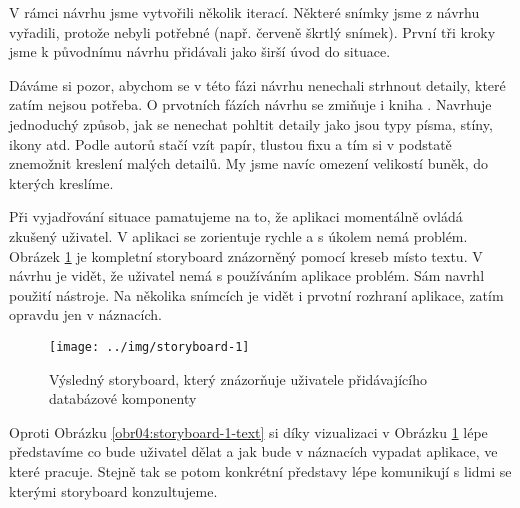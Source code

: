 V rámci návrhu jsme vytvořili několik iterací. Některé snímky jsme z návrhu vyřadili, protože nebyli potřebné (např. červeně škrtlý snímek). První tři kroky jsme k původnímu návrhu přidávali jako širší úvod do situace.

Dáváme si pozor, abychom se v této fázi návrhu nenechali strhnout detaily, které zatím nejsou potřeba. O prvotních fázích návrhu se zmiňuje i kniha \cite{Refactoring_UI}. Navrhuje jednoduchý způsob, jak se nenechat pohltit detaily jako jsou typy písma, stíny, ikony atd. Podle autorů stačí vzít papír, tlustou fixu a tím si v podstatě znemožnit kreslení malých detailů. My jsme navíc omezení velikostí buněk, do kterých kreslíme.

Při vyjadřování situace pamatujeme na to, že aplikaci momentálně ovládá zkušený uživatel. V  aplikaci se zorientuje rychle a s úkolem nemá problém. Obrázek \ref{obr04:storyboard-1} je kompletní storyboard znázorněný pomocí kreseb místo textu. V návrhu je vidět, že uživatel nemá s používáním aplikace problém. Sám navrhl použití nástroje. Na několika snímcích je vidět i prvotní rozhraní aplikace, zatím opravdu jen v náznacích.

\begin{figure}[htb]
    \centering
    \texttt{[image: ../img/storyboard-1]}
    \caption{\centering Výsledný storyboard, který znázorňuje uživatele přidávajícího databázové komponenty}
    \label{obr04:storyboard-1}
\end{figure}

Oproti Obrázku \ref{obr04:storyboard-1-text} si díky vizualizaci v Obrázku \ref{obr04:storyboard-1} lépe představíme co bude uživatel dělat a jak bude v náznacích vypadat aplikace, ve které pracuje. Stejně tak se potom konkrétní představy lépe komunikují s lidmi se kterými storyboard konzultujeme.

